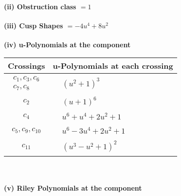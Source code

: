 \documentclass[1p]{elsarticle_modified}
\theoremstyle{definition}
\begin{document}
\flushleft \textbf{(ii) Obstruction class $= 1$}\\~\\
\flushleft \textbf{(iii) Cusp Shapes $= -4 u^4+8 u^2$}\\~\\
\newpage\renewcommand{\arraystretch}{1}
\flushleft \textbf{(iv) u-Polynomials at the component}\newline \\
\begin{tabular}{m{50pt}|m{274pt}}
Crossings & \hspace{64pt}u-Polynomials at each crossing \\
\hline $$\begin{aligned}c_{1},c_{3},c_{6}\\c_{7},c_{8}\end{aligned}$$&$\begin{aligned}
&(u^2+1)^3
\end{aligned}$\\
\hline $$\begin{aligned}c_{2}\end{aligned}$$&$\begin{aligned}
&(u+1)^6
\end{aligned}$\\
\hline $$\begin{aligned}c_{4}\end{aligned}$$&$\begin{aligned}
&u^6+u^4+2 u^2+1
\end{aligned}$\\
\hline $$\begin{aligned}c_{5},c_{9},c_{10}\end{aligned}$$&$\begin{aligned}
&u^6-3 u^4+2 u^2+1
\end{aligned}$\\
\hline $$\begin{aligned}c_{11}\end{aligned}$$&$\begin{aligned}
&(u^3- u^2+1)^2
\end{aligned}$\\
\hline
\end{tabular}\\~\\
\newpage\renewcommand{\arraystretch}{1}
\flushleft \textbf{(v) Riley Polynomials at the component}\newline \\
\end{document}
